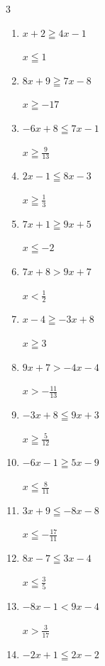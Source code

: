 \begin{multicols}{3}
\begin{enumerate}
  \item $x+2\geqq 4x-1$

        $\displaystyle x\leqq 1$

  \item $8x+9\geqq 7x-8$

        $\displaystyle x\geqq -17$

  \item $-6x+8\leqq 7x-1$

        $\displaystyle x\geqq \frac{9}{13}$

  \item $2x-1\leqq 8x-3$

        $\displaystyle x\geqq \frac{1}{3}$

  \item $7x+1\geqq 9x+5$

        $\displaystyle x\leqq -2$

  \item $7x+8>9x+7$

        $\displaystyle x<\frac{1}{2}$

  \item $x-4\geqq -3x+8$

        $\displaystyle x\geqq 3$

  \item $9x+7>-4x-4$

        $\displaystyle x>-\frac{11}{13}$

\columnbreak %

\resetques

  \item $-3x+8\leqq 9x+3$

        $\displaystyle x\geqq \frac{5}{12}$

  \item $-6x-1\geqq 5x-9$

        $\displaystyle x\leqq \frac{8}{11}$

  \item $3x+9\leqq -8x-8$

        $\displaystyle x\leqq -\frac{17}{11}$

  \item $8x-7\leqq 3x-4$

        $\displaystyle x\leqq \frac{3}{5}$

  \item $-8x-1<9x-4$

        $\displaystyle x>\frac{3}{17}$

  \item $-2x+1\leqq 2x-2$


\end{enumerate}
\end{multicols}

